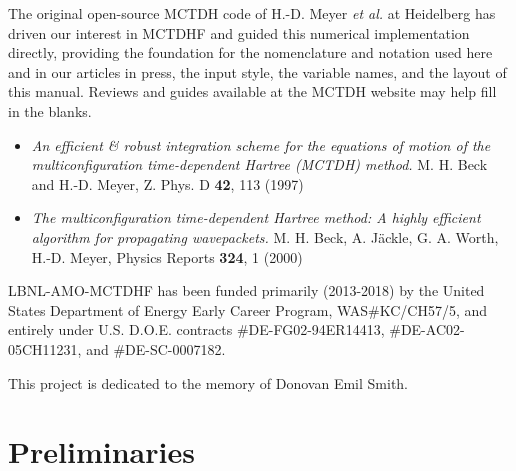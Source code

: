 \documentclass[10pt,leqno, oneside]{book}
\begin{document}

The original open-source MCTDH code of H.-D. Meyer \textit{et al.} at Heidelberg has driven our
interest in MCTDHF
and guided this numerical implementation directly, providing
the foundation for the nomenclature and notation used here and in our articles in press, the input style, the variable names, and the layout of this manual.
Reviews and guides available at the MCTDH website may help fill in the blanks.
\begin{itemize}[noitemsep]
%
\item{\textit{An efficient \& robust integration scheme for the equations of motion of the multiconfiguration time-dependent Hartree (MCTDH) method.}
M. H. Beck and H.-D. Meyer, Z. Phys. D \textbf{42}, 113 (1997)}
\item{\textit{The multiconfiguration time-dependent Hartree method: A highly efficient algorithm for propagating wavepackets.}
M. H. Beck, A. J{\"a}ckle, G. A. Worth, H.-D. Meyer, Physics Reports \textbf{324}, 1 (2000)}
\end{itemize}

LBNL-AMO-MCTDHF  has been funded 
primarily (2013-2018)
by the United States Department of Energy Early Career Program, 
WAS\#KC/CH57/5, and entirely
under U.S. D.O.E. contracts 
\#DE-FG02-94ER14413, %
\#DE-AC02-05CH11231, %
and \#DE-SC-0007182. %





This project is dedicated to the memory of Donovan Emil Smith.









\tableofcontents




\chapter*{Preliminaries}
\end{document}
